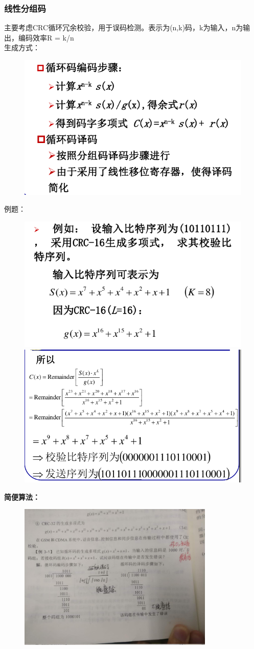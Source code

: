 \subsubsection{线性分组码}
主要考虑CRC循环冗余校验，用于误码检测。表示为(n,k)码，k为输入，n为输出，编码效率R = k/n\\
生成方式：
\begin{figure}[H]
	\centering
	\includegraphics[width=0.7\linewidth]{figures/CRC生成}
	\caption{}
	\label{fig:crc}
\end{figure}
例题：
\begin{figure}[H]
	\centering
	\includegraphics[width=0.7\linewidth]{figures/CRC生成1}	\includegraphics[width=0.7\linewidth]{figures/CRC生成2}
	\caption{}
	\label{fig:crc1}
\end{figure}
\textbf{简便算法：}
\begin{figure}[H]
	\centering
	\includegraphics[width=0.7\linewidth,height=7cm]{figures/CRC生成3}
\end{figure}

